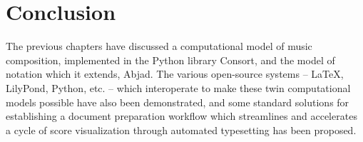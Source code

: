 \chapter{Conclusion}
\label{chap:conclusion}


The previous chapters have discussed a computational model of music
composition, implemented in the Python library Consort, and the model of
notation which it extends, Abjad. The various open-source systems -- \LaTeX{},
LilyPond, Python, etc. -- which interoperate to make these twin computational
models possible have also been demonstrated, and some standard solutions for
establishing a document preparation workflow which streamlines and accelerates
a cycle of score visualization through automated typesetting has been proposed.

